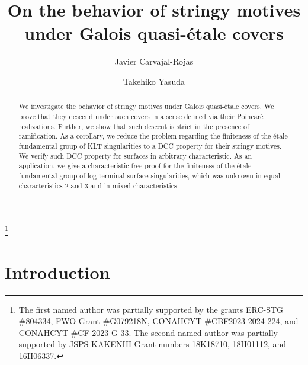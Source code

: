 \documentclass[12pt]{amsart}
\theoremstyle{plain}   %
\theoremstyle{definition}    %
\theoremstyle{remark}    %
\numberwithin{equation}{theorem}
\begin{document}
\title[Stringy motives under Galois quasi-\'etale covers]{On the behavior of stringy motives under Galois quasi-\'etale covers} 
\author[J.~Carvajal-Rojas]{Javier Carvajal-Rojas}
\address{Centro de Investigaci\'on en Matem\'aticas, A.C., Callej\'on Jalisco s/n, 36024 Col. Valenciana, Guanajuato, Gto, M\'exico}

\author[T.~Yasuda]{Takehiko Yasuda}
\address{Department of Mathematics, Graduate School of Science, Osaka University, Toyonaka, Osaka, 560--0043, Japan} 


\thanks{The first named author was partially supported by the grants ERC-STG \#804334, FWO Grant \#G079218N, CONAHCYT \#CBF2023-2024-224, and CONAHCYT \#CF-2023-G-33. The second named author was partially supported by JSPS KAKENHI Grant numbers 18K18710, 18H01112, and 16H06337.}




\begin{abstract}
We investigate the behavior of stringy motives under Galois quasi-\'etale covers. We prove that they descend under such covers in a sense defined via their Poincar\'e realizations. Further, we show that such descent is strict in the presence of ramification. As a corollary, we reduce the problem regarding the finiteness of the \'etale fundamental group of KLT singularities to a DCC property for their stringy motives. We verify such DCC property for surfaces in arbitrary characteristic. As an application, we give a characteristic-free proof for the finiteness of the \'etale fundamental group of log terminal surface singularities, which was unknown in equal characteristics $2$ and $3$ and in mixed characteristics. 
\end{abstract}
\maketitle


\section{Introduction} \label{sec.Introduction}
\end{document}
